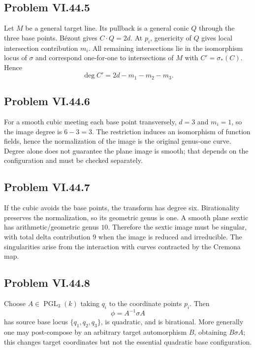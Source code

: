 \subsection*{Problem VI.44.5}
\begin{solution}
Let \(M\) be a general target line.  Its pullback is a general conic \(Q\) through the three base points.  Bézout gives \(C\cdot Q=2d\).  At \(p_i\), genericity of \(Q\) gives local intersection contribution \(m_i\).  All remaining intersections lie in the isomorphism locus of \(\sigma\) and correspond one-for-one to intersections of \(M\) with \(C'=\sigma_*(C)\).  Hence
\[
\deg C'=2d-m_1-m_2-m_3.
\]
\end{solution}

\subsection*{Problem VI.44.6}
\begin{solution}
For a smooth cubic meeting each base point transversely, \(d=3\) and \(m_i=1\), so the image degree is \(6-3=3\).  The restriction induces an isomorphism of function fields, hence the normalization of the image is the original genus-one curve.  Degree alone does not guarantee the plane image is smooth; that depends on the configuration and must be checked separately.
\end{solution}

\subsection*{Problem VI.44.7}
\begin{solution}
If the cubic avoids the base points, the transform has degree six.  Birationality preserves the normalization, so its geometric genus is one.  A smooth plane sextic has arithmetic/geometric genus \(10\).  Therefore the sextic image must be singular, with total delta contribution \(9\) when the image is reduced and irreducible.  The singularities arise from the interaction with curves contracted by the Cremona map.
\end{solution}

\subsection*{Problem VI.44.8}
\begin{solution}
Choose \(A\in\operatorname{PGL}_3(k)\) taking \(q_i\) to the coordinate points \(p_i\).  Then
\[
\phi=A^{-1}\sigma A
\]
has source base locus \(\{q_1,q_2,q_3\}\), is quadratic, and is birational.  More generally one may post-compose by an arbitrary target automorphism \(B\), obtaining \(B\sigma A\); this changes target coordinates but not the essential quadratic base configuration.
\end{solution}

